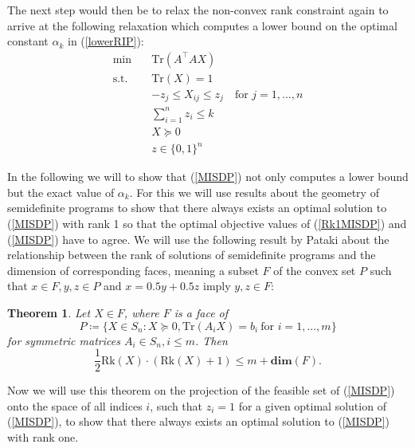 \documentclass[journal]{IEEEtran}
\newtheorem{theorem}{Theorem}
\newcommand{\define}{\coloneqq}
\newcommand{\T}{^{\top}}
\newcommand{\Tr}{\text{Tr}}
\newcommand{\Rk}{\text{Rk}}
\begin{document}
The next step would then be to relax the non-convex rank constraint again to arrive at the following relaxation which computes a lower bound on the optimal constant $\alpha_k$ in (\ref{lowerRIP}):
\begin{align}\label{MISDP}
 \min \quad & \Tr(A\T A X) \nonumber \\
 \text{s.t.} \quad & \Tr(X) = 1 \nonumber \\
 & -z_j \leq X_{ij} \leq z_j \quad \text{for } j = 1, ..., n \nonumber \\
 & \sum_{i=1}^n z_i \leq k \tag{MISDP} \\
 & X \succeq 0  \nonumber \\
 & z \in \{0,1\}^n \nonumber
\end{align}

In the following we will to show that (\ref{MISDP}) not only computes a lower bound but the exact value of $\alpha_k$. For this we will use results about the geometry of semidefinite programs to show that there always exists an 
optimal solution to (\ref{MISDP}) with rank 1 so that the optimal objective values of (\ref{Rk1MISDP}) and (\ref{MISDP}) have to agree. We will use the following result by Pataki \cite{pat98} about the relationship between the rank of
solutions of semidefinite programs and the dimension of corresponding faces, meaning a subset $F$ of the convex set $P$ such that \mbox{$x \in F, y, z \in P$} and $x = 0.5y + 0.5z$ imply $y,z \in F$:

\begin{theorem}\label{patakiLemma}
 Let $X \in F$, where $F$ is a face of
 \begin{equation*}
 P \define \{X \in S_n : X \succeq 0, \Tr(A_i X) = b_i \ \text{for } i = 1, ..., m\}
 \end{equation*}
 for symmetric matrices $A_i \in S_n, i \leq m$. Then
 \begin{equation*}
  \frac{1}{2}\Rk(X)\cdot(\Rk(X)+1) \leq m + \textbf{dim}(F).
 \end{equation*}
\end{theorem}

Now we will use this theorem on the projection of the feasible set of (\ref{MISDP}) onto the space of all indices $i$, such that $z_i = 1$ for a given optimal solution of (\ref{MISDP}), to show that there always exists an optimal 
solution to (\ref{MISDP}) with rank one.
\end{document}
